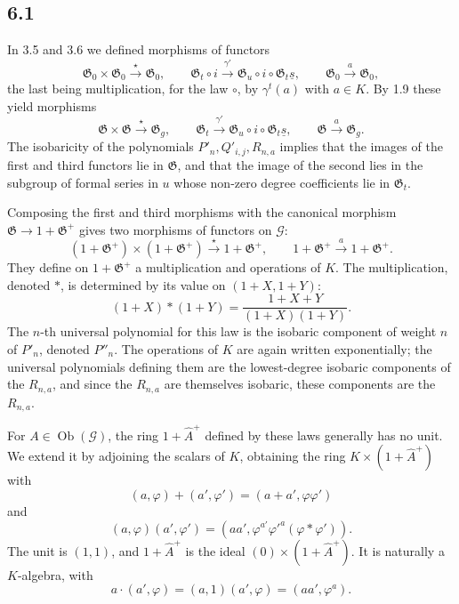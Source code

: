 \documentclass[13pt]{extarticle}
\newcommand{\Go}{\mathfrak G}
\newcommand{\Goi}{\mathfrak G_0}
\newcommand{\Got}{\mathfrak G_t}
\newcommand{\Gou}{\mathfrak G_u}
\newcommand{\us}{\underline{s}}
\newcommand{\Obj}{\operatorname{Ob}}
\begin{document}
\subsection*{6.1}
In 3.5 and 3.6 we defined morphisms of functors
\[
\Goi\times\Goi\xrightarrow{\star}\Goi,
\qquad
\Got\circ i\xrightarrow{\gamma'}\Gou\circ i\circ\Got\us,
\qquad
\Goi\xrightarrow{a}\Goi,
\]
the last being multiplication, for the law $\circ$, by $\gamma^t(a)$ with $a\in K$. By 1.9 these yield morphisms
\[
\Go\times\Go\xrightarrow{\star}\Go_g,
\qquad
\Got\xrightarrow{\gamma'}\Gou\circ i\circ\Got\us,
\qquad
\Go\xrightarrow{a}\Go_g.
\]
The isobaricity of the polynomials $P'_n,Q'_{i,j},R_{n,a}$ implies that the images of the first and third functors lie in $\Go$, and that the image of the second lies in the subgroup of formal series in $u$ whose non-zero degree coefficients lie in $\Got$.

Composing the first and third morphisms with the canonical morphism $\Go\to 1+\Go^+$ gives two morphisms of functors on $\mathcal G$:
\[
(1+\Go^+)\times(1+\Go^+)\xrightarrow{\star}1+\Go^+,
\qquad
1+\Go^+\xrightarrow{a}1+\Go^+.
\]
They define on $1+\Go^+$ a multiplication and operations of $K$. The multiplication, denoted $*$, is determined by its value on $(1+X,1+Y)$:
\begin{equation}\label{eq:6.1.1}
(1+X)*(1+Y)=\frac{1+X+Y}{(1+X)(1+Y)}.
\end{equation}
The $n$-th universal polynomial for this law is the isobaric component of weight $n$ of $P'_n$, denoted $P''_n$. The operations of $K$ are again written exponentially; the universal polynomials defining them are the lowest-degree isobaric components of the $R_{n,a}$, and since the $R_{n,a}$ are themselves isobaric, these components are the $R_{n,a}$.

For $A\in\Obj(\mathcal G)$, the ring $1+\widehat A^+$ defined by these laws generally has no unit. We extend it by adjoining the scalars of $K$, obtaining the ring $K\times(1+\widehat A^+)$ with
\[
(a,\varphi)+(a',\varphi')=(a+a',\varphi\varphi')
\]
and
\begin{equation}\label{eq:6.1.2}
(a,\varphi)(a',\varphi')=(aa',\varphi^{a'}\varphi'^{a}(\varphi*\varphi')).
\end{equation}
The unit is $(1,1)$, and $1+\widehat A^+$ is the ideal $(0)\times(1+\widehat A^+)$. It is naturally a $K$-algebra, with
\begin{equation}\label{eq:6.1.3}
a\cdot(a',\varphi)=(a,1)(a',\varphi)=(aa',\varphi^a).
\end{equation}
\end{document}
